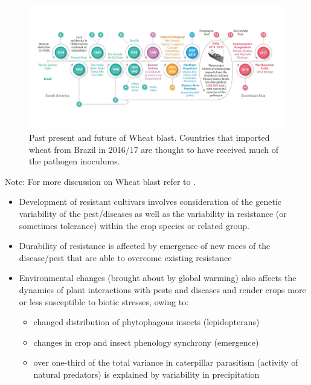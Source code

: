 \documentclass[11pt,dvipsnames,ignorenonframetext,aspectratio=169]{beamer}
\providecommand{\tightlist}{%
  \setlength{\itemsep}{0pt}\setlength{\parskip}{0pt}}
\begin{document}
\begin{frame}{}
\protect\hypertarget{section-4}{}
\begin{figure}
\includegraphics[width=0.86\linewidth]{../images/wheat_blast_distribution_due_brazil} \caption{Past present and future of Wheat blast. Countries that imported wheat from Brazil in 2016/17 are thought to have received much of the pathogen inoculums.}\label{fig:wheat-blast}
\end{figure}

\footnotesize Note: For more discussion on Wheat blast refer to
\citet{ceresini2018wheat}.
\end{frame}

\begin{frame}{}
\protect\hypertarget{section-5}{}
\begin{itemize}
\tightlist
\item
  Development of resistant cultivars involves consideration of the
  genetic variability of the pest/diseases as well as the variability in
  resistance (or sometimes tolerance) within the crop species or related
  group.
\item
  Durability of resistance is affected by emergence of new races of the
  disease/pest that are able to overcome existing resistance
\item
  Environmental changes (brought about by global warming) also affects
  the dynamics of plant interactions with pests and diseases and render
  crops more or less susceptible to biotic stresses, owing to:

  \begin{itemize}
  \tightlist
  \item
    changed distribution of phytophagous insects (lepidopterans)
  \item
    changes in crop and insect phenology synchrony (emergence)
  \item
    over one-third of the total variance in caterpillar parasitism
    (activity of natural predators) is explained by variability in
    precipitation
  \end{itemize}
\end{itemize}
\end{frame}
\end{document}
